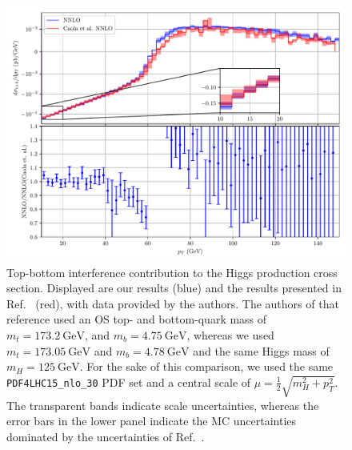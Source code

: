 \begin{figure}[ht]
\centering
\includegraphics[width=\figurewidth]{Images/Caola_comparison}
\caption{Top-bottom interference contribution to the Higgs production cross section. Displayed are our results (blue) and the results presented in Ref.~\cite{Caola:2018zye} (red), with data provided by the authors. The authors of that reference used an \acs{OS} top- and bottom-quark mass of $m_t = 173.2\ \mathrm{GeV}$, and $m_b = 4.75\ \mathrm{GeV}$, whereas we used $m_t = 173.05\ \mathrm{GeV}$ and $m_b = 4.78\ \mathrm{GeV}$ and the same Higgs mass of $m_H = 125\ \mathrm{GeV}$. For the sake of this comparison, we used the same \texttt{PDF4LHC15\_nlo\_30} \acs{PDF} set and a central scale of $\mu = \frac{1}{2}\sqrt{m_H^2 + p_T^2}$. The transparent bands indicate scale uncertainties, whereas the error bars in the lower panel indicate the \acs{MC} uncertainties dominated by the uncertainties of Ref.~\cite{Caola:2018zye}.}
\label{fig:6:caola_comparison}
\end{figure}

